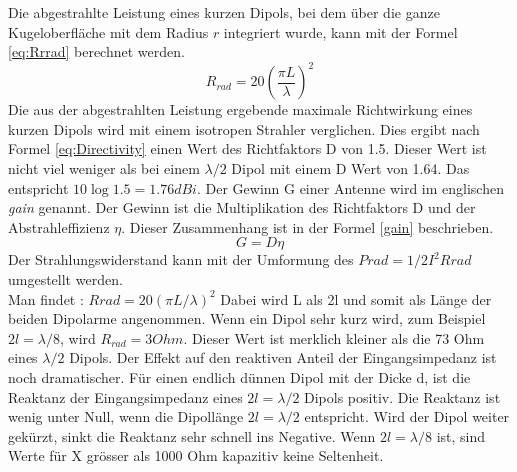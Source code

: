 Die abgestrahlte Leistung eines kurzen Dipols, bei dem über die ganze Kugeloberfläche mit dem Radius $r$ integriert wurde, kann mit der Formel \ref{eq:Rrrad} berechnet werden\cite{elliott1981antenna}.
\begin{equation}\label{eq:Rrrad}
R_{rad}=20 \left(\frac{\pi L}{\lambda} \right) ^{2}
\end{equation}
Die aus der abgestrahlten Leistung ergebende maximale Richtwirkung eines kurzen Dipols wird  mit einem isotropen Strahler verglichen. Dies ergibt nach Formel \ref{eq:Directivity} einen Wert des Richtfaktors D von 1.5. Dieser Wert ist nicht viel weniger als bei einem $\lambda/2$ Dipol mit einem D Wert von 1.64. Das entspricht $10\log{1.5}=1.76dBi$. Der Gewinn G einer Antenne wird im englischen \textit{gain} genannt. Der Gewinn ist die Multiplikation des Richtfaktors D und der Abstrahleffizienz $\eta$. Dieser Zusammenhang ist in der Formel \ref{gain} beschrieben.
\begin{equation}\label{gain}
G=D\eta
\end{equation}
Der Strahlungswiderstand kann mit der Umformung des $Prad=1/2 I^{2}Rrad$ umgestellt werden. \\
Man findet :
$Rrad=20\left(\pi L/\lambda\right)^{2}$ 
Dabei wird L als 2l und somit als Länge der beiden Dipolarme angenommen.
Wenn ein Dipol sehr kurz wird, zum Beispiel $2l=\lambda/8$,  wird $R_{rad} = 3 Ohm$. Dieser Wert ist merklich kleiner als   die 73 Ohm   eines $\lambda/2$ Dipols. Der Effekt auf den reaktiven Anteil der Eingangsimpedanz ist noch dramatischer. Für einen endlich dünnen Dipol mit der Dicke d, ist die Reaktanz der Eingangsimpedanz eines $2l=\lambda/2$ Dipols positiv. Die Reaktanz ist wenig unter Null, wenn die Dipollänge  $2l=\lambda/2$ entspricht. Wird der Dipol weiter gekürzt,  sinkt die Reaktanz sehr schnell ins Negative. Wenn  $2l=\lambda/8$ ist,  sind Werte für X grösser als 1000 Ohm kapazitiv keine Seltenheit\cite{elliott1981antenna}. 




